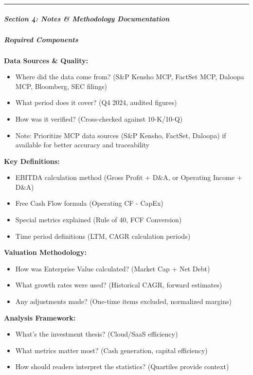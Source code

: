 \documentclass[11pt]{article}
\begin{document}
\vspace{0.5em}\hrule\vspace{0.5em}

\subparagraph{Section 4: Notes \& Methodology Documentation}\mbox{}\par

\subparagraph{Required Components}\mbox{}\par

\textbf{Data Sources \& Quality:}

\begin{itemize}[leftmargin=*,itemsep=2pt,topsep=2pt]
\item {} Where did the data come from? (S\&P Kensho MCP, FactSet MCP, Daloopa MCP, Bloomberg, SEC filings)
\item {} What period does it cover? (Q4 2024, audited figures)
\item {} How was it verified? (Cross-checked against 10-K/10-Q)
\item {} Note: Prioritize MCP data sources (S\&P Kensho, FactSet, Daloopa) if available for better accuracy and traceability
\end{itemize}

\textbf{Key Definitions:}

\begin{itemize}[leftmargin=*,itemsep=2pt,topsep=2pt]
\item {} EBITDA calculation method (Gross Profit + D\&A, or Operating Income + D\&A)
\item {} Free Cash Flow formula (Operating CF - CapEx)
\item {} Special metrics explained (Rule of 40, FCF Conversion)
\item {} Time period definitions (LTM, CAGR calculation periods)
\end{itemize}

\textbf{Valuation Methodology:}

\begin{itemize}[leftmargin=*,itemsep=2pt,topsep=2pt]
\item {} How was Enterprise Value calculated? (Market Cap + Net Debt)
\item {} What growth rates were used? (Historical CAGR, forward estimates)
\item {} Any adjustments made? (One-time items excluded, normalized margins)
\end{itemize}

\textbf{Analysis Framework:}

\begin{itemize}[leftmargin=*,itemsep=2pt,topsep=2pt]
\item {} What's the investment thesis? (Cloud/SaaS efficiency)
\item {} What metrics matter most? (Cash generation, capital efficiency)
\item {} How should readers interpret the statistics? (Quartiles provide context)
\end{itemize}
\end{document}
